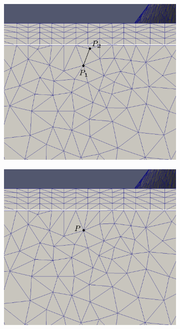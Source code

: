 \begin{figure}[hbt!]
\centering
\begin{subfigure}{.5\textwidth}
  \centering
  \includegraphics[width=.9\linewidth, trim={0 5cm 0  0}, clip]{img/m2/interior-vert-collapse/cc1.eps}
  \caption{}
  \label{cc1}
\end{subfigure}%
\begin{subfigure}{.5\textwidth}
  \centering
  \includegraphics[width=.9\linewidth, trim={0 5cm 0  0}, clip]{img/m2/interior-vert-collapse/cc2.eps}
  \caption{}
  \label{cc2}
\end{subfigure}

\end{figure}
